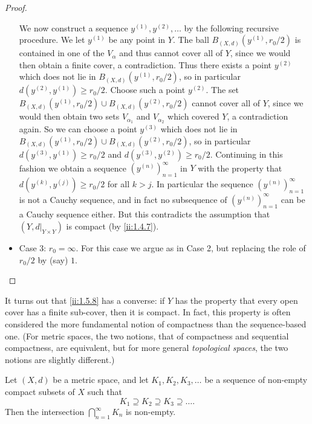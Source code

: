 \begin{proof}
\begin{itemize}
          We now construct a sequence \(y^{(1)}, y^{(2)}, \dots\) by the following recursive procedure.
          We let \(y^{(1)}\) be any point in \(Y\).
          The ball \(B_{(X, d)}(y^{(1)}, r_0 / 2)\) is contained in one of the \(V_{\alpha}\) and thus cannot cover all of \(Y\), since we would then obtain a finite cover, a contradiction.
          Thus there exists a point \(y^{(2)}\) which does not lie in \(B_{(X, d)}(y^{(1)}, r_0 / 2)\), so in particular \(d(y^{(2)}, y^{(1)}) \geq r_0 / 2\).
          Choose such a point \(y^{(2)}\).
          The set \(B_{(X, d)}(y^{(1)}, r_0 / 2) \cup B_{(X, d)}(y^{(2)}, r_0 / 2)\) cannot cover all of \(Y\), since we would then obtain two sets \(V_{\alpha_1}\) and \(V_{\alpha_2}\) which covered \(Y\), a contradiction again.
          So we can choose a point \(y^{(3)}\) which does not lie in \(B_{(X, d)}(y^{(1)}, r_0 / 2) \cup B_{(X, d)}(y^{(2)}, r_0 / 2)\), so in particular \(d(y^{(3)}, y^{(1)}) \geq r_0 / 2\) and \(d(y^{(3)}, y^{(2)}) \geq r_0 / 2\).
          Continuing in this fashion we obtain a sequence \((y^{(n)})_{n = 1}^\infty\) in \(Y\) with the property that \(d(y^{(k)}, y^{(j)}) \geq r_0 / 2\) for all \(k > j\).
          In particular the sequence \((y^{(n)})_{n = 1}^\infty\) is not a Cauchy sequence, and in fact no subsequence of \((y^{(n)})_{n = 1}^\infty\) can be a Cauchy sequence either.
          But this contradicts the assumption that \((Y, d|_{Y \times Y})\) is compact (by \cref{ii:1.4.7}).
    \item Case 3:
          \(r_0 = \infty\).
          For this case we argue as in Case 2, but replacing the role of \(r_0 / 2\) by (say) \(1\).
  \end{itemize}
\end{proof}

\begin{note}
  It turns out that \cref{ii:1.5.8} has a converse:
  if \(Y\) has the property that every open cover has a finite sub-cover, then it is compact.
  In fact, this property is often considered the more fundamental notion of compactness than the sequence-based one.
  (For metric spaces, the two notions, that of compactness and sequential compactness, are equivalent, but for more general \emph{topological spaces}, the two notions are slightly diﬀerent.)
\end{note}

\begin{cor}\label{ii:1.5.9}
  Let \((X, d)\) be a metric space, and let \(K_1, K_2, K_3, \dots\) be a sequence of non-empty compact subsets of \(X\) such that
  \[
    K_1 \supseteq K_2 \supseteq K_3 \supseteq \dots.
  \]
  Then the intersection \(\bigcap_{n = 1}^\infty K_n\) is non-empty.
\end{cor}

